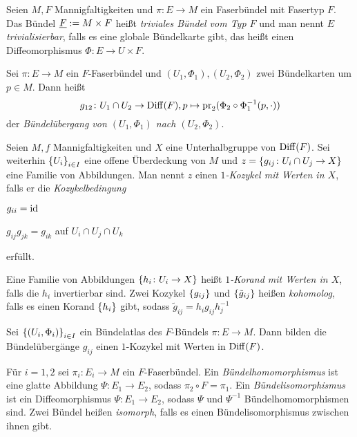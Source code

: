 \begin{definition}
  Seien $M,F$ Mannigfaltigkeiten und $\pi\colon E\to M$ ein
  Faserbündel mit Fasertyp $F$. Das Bündel $\underline{F} := M\times F$
  heißt \emph{triviales Bündel vom Typ $F$} und man nennt $E$
  \emph{trivialisierbar}, falls es eine globale Bündelkarte gibt, das
  heißt einen Diffeomorphismus $\Phi \colon E \to U \times F$.
\end{definition}

\begin{definition}
  Sei $\pi\colon E\to M$ ein $F$-Faserbündel und $(U_1,\Phi_1),
  (U_2,\Phi_2)$ zwei Bündelkarten um $p\in M$. Dann heißt
  \begin{equation*}
    g_{12} \colon U_1\cap U_2 \to \operatorname{Diff}(F), p\mapsto \operatorname{pr}_2(\Phi_2\circ \Phi_1^{-1}(p,\cdot))
  \end{equation*}
  der \emph{Bündelübergang von $(U_1,\Phi_1)$ nach $(U_2,\Phi_2)$}.
\end{definition}

\begin{definition}
  Seien $M,f$ Mannigfaltigkeiten und $X$ eine Unterhalbgruppe von
  $\operatorname{Diff}(F)$. Sei weiterhin $\left\lbrace U_i \right\rbrace_{i\in I}$ eine offene
  Überdeckung von $M$ und $z = \left\lbrace  g_{ij} \colon U_i\cap U_j \to X \right\rbrace$
  eine Familie von Abbildungen. Man nennt $z$ einen
  \emph{$1$-Kozykel mit Werten in $X$}, falls er die \emph{Kozykelbedingung}
  \begin{statements}
  \item $g_{ii} = \operatorname{id}$
  \item $g_{ij} g_{jk} = g_{ik}$ auf $U_i\cap U_j\cap U_k$
  \end{statements}
  erfüllt.

  Eine Familie von Abbildungen $\left\lbrace h_i\colon U_i \to X \right\rbrace$ heißt
  \emph{$1$-Korand mit Werten in $X$}, falls die $h_i$ invertierbar
  sind. Zwei Kozykel $\left\lbrace g_{ij} \right\rbrace$ und
  $\left\lbrace \tilde{g}_{ij} \right\rbrace$ heißen \emph{kohomolog}, falls es einen
  Korand $\left\lbrace h_i \right\rbrace$ gibt, sodass $\tilde{g}_{ij} = h_i g_{ij} h_j^{-1}$ 
\end{definition}

\begin{proposition}
  Sei $\left\lbrace (U_i,\Phi_i) \right\rbrace_{i\in I}$ ein Bündelatlas des $F$-Bündels
  $\pi\colon E \to M$. Dann bilden die Bündelübergänge $g_{ij}$ einen
  $1$-Kozykel mit Werten in $\operatorname{Diff}(F)$.
\end{proposition}

\begin{definition}
  Für $i=1,2$ sei $\pi_i\colon E_i \to M$ ein $F$-Faserbündel. Ein
  \emph{Bündelhomomorphismus} 
  ist eine glatte Abbildung $\Psi\colon E_1 \to E_2$, sodass
  $\pi_2\circ F = \pi_1$. Ein \emph{Bündelisomorphismus} ist ein
  Diffeomorphismus $\Psi\colon E_1\to E_2$, sodass $\Psi$ und
  $\Psi^{-1}$ Bündelhomomorphismen sind. Zwei Bündel heißen
  \emph{isomorph}, falls es einen Bündelisomorphismus zwischen ihnen gibt.
\end{definition}


